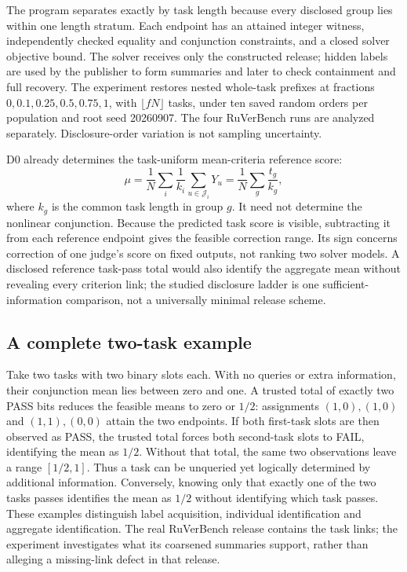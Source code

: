 The program separates exactly by task length because every disclosed group
lies within one length stratum. Each endpoint has an attained integer
witness, independently checked equality and conjunction constraints, and a
closed solver objective bound. The solver receives only the constructed
release; hidden labels are used by the publisher to form summaries and
later to check containment and full recovery. The experiment restores
nested whole-task prefixes at fractions $0,0.1,0.25,0.5,0.75,1$, with
$\lfloor fN\rfloor$ tasks, under ten saved random orders per population and
root seed 20260907. The four RuVerBench runs are analyzed separately.
Disclosure-order variation is not sampling uncertainty.

D0 already determines the task-uniform mean-criteria reference score:
\begin{equation}
 \mu=\frac{1}{N}\sum_i\frac{1}{k_i}
                      \sum_{u\in\mathcal J_i}Y_u
     =\frac{1}{N}\sum_g\frac{t_g}{k_g},
 \label{app:eq:linear-control}
\end{equation}
where $k_g$ is the common task length in group $g$. It need not determine
the nonlinear conjunction. Because the predicted task score is visible,
subtracting it from each reference endpoint gives the feasible correction
range. Its sign concerns correction of one judge's score on fixed outputs,
not ranking two solver models. A disclosed reference task-pass total would
also identify the aggregate mean without revealing every criterion link;
the studied disclosure ladder is one sufficient-information comparison,
not a universally minimal release scheme.

\subsection{A complete two-task example}
\label{app:example}

Take two tasks with two binary slots each. With no queries or extra
information, their conjunction mean lies between zero and one. A trusted
total of exactly two PASS bits reduces the feasible means to zero or
$1/2$: assignments $(1,0),(1,0)$ and $(1,1),(0,0)$ attain the two endpoints.
If both first-task slots are then observed as PASS, the trusted total forces
both second-task slots to FAIL, identifying the mean as $1/2$. Without that
total, the same two observations leave a range $[1/2,1]$. Thus a task can
be unqueried yet logically determined by additional information. Conversely,
knowing only that exactly one of the two tasks passes identifies the mean
as $1/2$ without identifying which task passes. These examples distinguish
label acquisition, individual identification and aggregate identification.
The real RuVerBench release contains the task links; the experiment
investigates what its coarsened summaries support, rather than alleging a
missing-link defect in that release.


